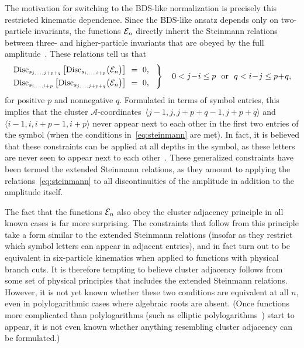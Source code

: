 \documentclass[12pt]{article}
\def\ket#1{\langle #1 \rangle}
\def\acoords{$\mathcal{A}$-coordinates}
\begin{document}
The motivation for switching to the BDS-like normalization is precisely this restricted kinematic dependence. Since the BDS-like ansatz depends only on two-particle invariants, the functions ${\cal E}_n$ directly inherit the Steinmann relations between three- and higher-particle invariants that are obeyed by the full amplitude~\cite{Steinmann,Steinmann2,Cahill:1973qp,Caron-Huot:2016owq,Dixon:2016nkn}. These relations tell us that
\begin{equation} \label{eq:steinmann}
\begin{rcases}
\text{Disc}_{s_{j,\dots,j+p+q}}\left[\text{Disc}_{s_{i,\dots,i+p}} \big({\cal E}_n \big) \right] &\!\!= \ 0, \hspace{.3cm} \\
\text{Disc}_{s_{i,\dots,i+p}}\left[\text{Disc}_{s_{j,\dots,j+p+q}} \big({\cal E}_n \big) \right] &\!\!= \ 0, 
\end{rcases} \quad 
\begin{gathered} 0 < j\!-\!i \leq p \text{\ \ or\ \ } q < i\!-\!j  \leq p\!+\!q, \end{gathered}
\end{equation}
for positive $p$ and nonnegative $q$. Formulated in terms of symbol entries, this implies that the cluster \acoords\ $\ket{j-1,j,j+p+q-1,j+p+q}$ and $\ket{i-1,i,i+p-1,i+p}$ never appear next to each other in the first two entries of the symbol (when the conditions in~\eqref{eq:steinmann} are met). In fact, it is believed that these constraints can be applied at all depths in the symbol, as these letters are never seen to appear next to each other~\cite{Caron-Huot:2016owq,Dixon:2016nkn,Caron-Huot:2018dsv,cosmic_galois_paper}. These generalized constraints have been termed the extended Steinmann relations, as they amount to applying the relations~\eqref{eq:steinmann} to all discontinuities of the amplitude in addition to the amplitude itself. 

The fact that the functions ${\cal E}_n$ also obey the cluster adjacency principle in all known cases is far more surprising. The constraints that follow from this principle take a form similar to the extended Steinmann relations (insofar as they restrict which symbol letters can appear in adjacent entries), and in fact turn out to be equivalent in six-particle kinematics when applied to functions with physical branch cuts. It is therefore tempting to believe cluster adjacency follows from some set of physical principles that includes the extended Steinmann relations. However, it is not yet known whether these two conditions are equivalent at all $n$, even in polylogarithmic cases where algebraic roots are absent. (Once functions more complicated than polylogarithms (such as elliptic polylogarithms~\cite{Broedel:2017kkb,Broedel:2018qkq}) start to appear, it is not even known whether anything resembling cluster adjacency can be formulated.)
\end{document}
